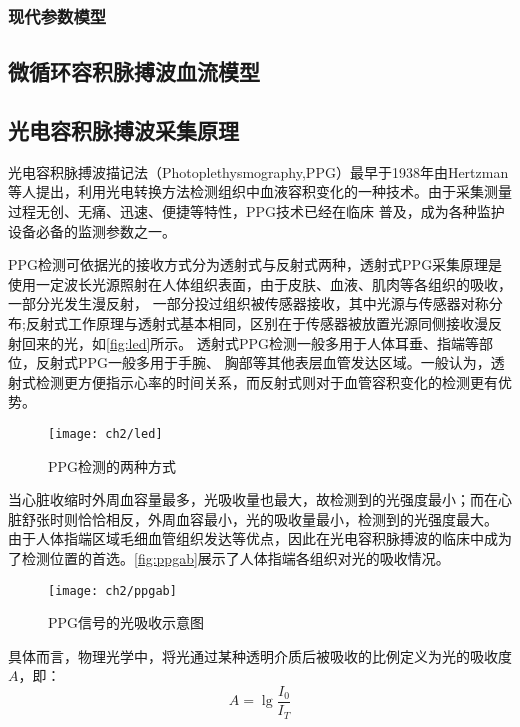 \subsubsection{现代参数模型}

\subsection{微循环容积脉搏波血流模型}

\subsection{光电容积脉搏波采集原理}
光电容积脉搏波描记法（Photoplethysmography,PPG）最早于1938年由Hertzman等人提出，利用光电转换方法检测组织中血液容积变化的一种技术。由于采集测量过程无创、无痛、迅速、便捷等特性，PPG技术已经在临床
普及，成为各种监护设备必备的监测参数之一\cite{ldl,lhc}。

PPG检测可依据光的接收方式分为透射式与反射式两种\cite{THOCBPM}，透射式PPG采集原理是使用一定波长光源照射在人体组织表面，由于皮肤、血液、肌肉等各组织的吸收，一部分光发生漫反射，
一部分投过组织被传感器接收，其中光源与传感器对称分布;反射式工作原理与透射式基本相同，区别在于传感器被放置光源同侧接收漫反射回来的光\cite{THOCBPM,mmt}，如\autoref{fig:led}所示。
透射式PPG检测一般多用于人体耳垂、指端等部位，反射式PPG一般多用于手腕、
胸部等其他表层血管发达区域\cite{THOCBPM}。一般认为，透射式检测更方便指示心率的时间关系，而反射式则对于血管容积变化的检测更有优势\cite{mmt}。
\begin{figure}[htb]
    \centering
    \texttt{[image: ch2/led]}
    \caption{\label{fig:led}PPG检测的两种方式}
\end{figure}

当心脏收缩时外周血容量最多，光吸收量也最大，故检测到的光强度最小；而在心脏舒张时则恰恰相反，外周血容最小，光的吸收量最小，检测到的光强度最大\cite{lhc,cwl}。
由于人体指端区域毛细血管组织发达等优点，因此在光电容积脉搏波的临床中成为了检测位置的首选。\autoref{fig:ppgab}展示了人体指端各组织对光的吸收情况。
\begin{figure}[htb]
    \centering
    \texttt{[image: ch2/ppgab]}
    \caption{\label{fig:ppgab}PPG信号的光吸收示意图}
\end{figure}

具体而言，物理光学中，将光通过某种透明介质后被吸收的比例定义为光的吸收度$A$，即：
\begin{equation}
    \label{equ:LBL}
    A=\lg\frac{I_{0}}{I_{T}}
\end{equation}

